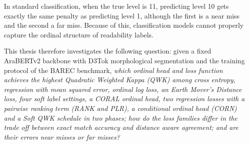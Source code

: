 In standard classification, when the true level is 11, predicting level 10 gets exactly the same penalty as predicting level 1, although the first is a near miss and the second a far miss. Because of this, classification models cannot properly capture the ordinal structure of readability labels.

This thesis therefore investigates the following question: given a fixed AraBERTv2 backbone with D3Tok morphological segmentation and the training protocol of the BAREC benchmark, \emph{which ordinal head and loss function achieves the highest Quadratic Weighted Kappa (QWK) among cross entropy, regression with mean squared error, ordinal log loss, an Earth Mover's Distance loss, four soft label settings, a CORAL ordinal head, two regression losses with a pairwise ranking term (RANK and PLR), a conditional ordinal head (CORN) and a Soft QWK schedule in two phases; how do the loss families differ in the trade off between exact match accuracy and distance aware agreement; and are their errors near misses or far misses?}

